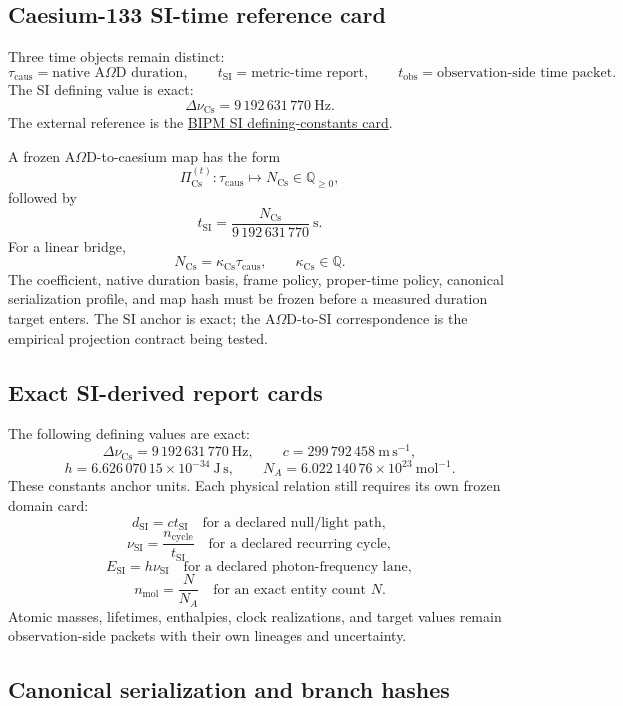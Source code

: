 \subsection{Caesium-133 SI-time reference card}

Three time objects remain distinct:
\[
\tau_{\mathrm{caus}}
=\text{native A$\Omega$D duration},
\qquad
t_{\mathrm{SI}}
=\text{metric-time report},
\qquad
t_{\mathrm{obs}}
=\text{observation-side time packet}.
\]
The SI defining value is exact:
\[
\Delta\nu_{\mathrm{Cs}}=9\,192\,631\,770\ \mathrm{Hz}.
\]
The external reference is the \href{https://www.bipm.org/en/measurement-units/si-defining-constants}{BIPM SI defining-constants card}.

A frozen A$\Omega$D-to-caesium map has the form
\[
\Pi_{\mathrm{Cs}}^{(t)}:\tau_{\mathrm{caus}}\longmapsto N_{\mathrm{Cs}}\in\mathbb Q_{\ge0},
\]
followed by
\[
\boxed{
 t_{\mathrm{SI}}
 =
 \frac{N_{\mathrm{Cs}}}{9\,192\,631\,770}\ \mathrm{s}.
}
\]
For a linear bridge,
\[
N_{\mathrm{Cs}}=\kappa_{\mathrm{Cs}}\tau_{\mathrm{caus}},
\qquad
\kappa_{\mathrm{Cs}}\in\mathbb Q.
\]
The coefficient, native duration basis, frame policy, proper-time policy, canonical serialization profile, and map hash must be frozen before a measured duration target enters.  The SI anchor is exact; the A$\Omega$D-to-SI correspondence is the empirical projection contract being tested.

\subsection{Exact SI-derived report cards}

The following defining values are exact:
\[
\Delta\nu_{\mathrm{Cs}}=9\,192\,631\,770\ \mathrm{Hz},
\qquad
c=299\,792\,458\ \mathrm{m\,s^{-1}},
\]
\[
h=6.626\,070\,15\times10^{-34}\ \mathrm{J\,s},
\qquad
N_A=6.022\,140\,76\times10^{23}\ \mathrm{mol^{-1}}.
\]
These constants anchor units.  Each physical relation still requires its own frozen domain card:
\[
d_{\mathrm{SI}}=ct_{\mathrm{SI}}
\quad\text{for a declared null/light path},
\]
\[
\nu_{\mathrm{SI}}=\frac{n_{\mathrm{cycle}}}{t_{\mathrm{SI}}}
\quad\text{for a declared recurring cycle},
\]
\[
E_{\mathrm{SI}}=h\nu_{\mathrm{SI}}
\quad\text{for a declared photon-frequency lane},
\]
\[
n_{\mathrm{mol}}=\frac{N}{N_A}
\quad\text{for an exact entity count }N.
\]
Atomic masses, lifetimes, enthalpies, clock realizations, and target values remain observation-side packets with their own lineages and uncertainty.

\subsection{Canonical serialization and branch hashes}

